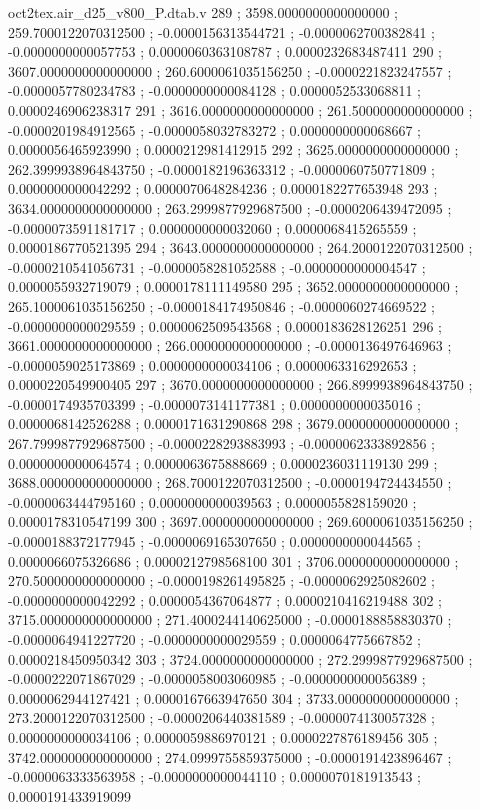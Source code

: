 \begin{filecontents}[overwrite]{oct2tex.air_d25_v800_P.dtab.v}
289 ; 3598.0000000000000000 ; 259.7000122070312500 ; -0.0000156313544721 ; -0.0000062700382841 ; -0.0000000000057753 ; 0.0000060363108787 ; 0.0000232683487411
290 ; 3607.0000000000000000 ; 260.6000061035156250 ; -0.0000221823247557 ; -0.0000057780234783 ; -0.0000000000084128 ; 0.0000052533068811 ; 0.0000246906238317
291 ; 3616.0000000000000000 ; 261.5000000000000000 ; -0.0000201984912565 ; -0.0000058032783272 ; 0.0000000000068667 ; 0.0000056465923990 ; 0.0000212981412915
292 ; 3625.0000000000000000 ; 262.3999938964843750 ; -0.0000182196363312 ; -0.0000060750771809 ; 0.0000000000042292 ; 0.0000070648284236 ; 0.0000182277653948
293 ; 3634.0000000000000000 ; 263.2999877929687500 ; -0.0000206439472095 ; -0.0000073591181717 ; 0.0000000000032060 ; 0.0000068415265559 ; 0.0000186770521395
294 ; 3643.0000000000000000 ; 264.2000122070312500 ; -0.0000210541056731 ; -0.0000058281052588 ; -0.0000000000004547 ; 0.0000055932719079 ; 0.0000178111149580
295 ; 3652.0000000000000000 ; 265.1000061035156250 ; -0.0000184174950846 ; -0.0000060274669522 ; -0.0000000000029559 ; 0.0000062509543568 ; 0.0000183628126251
296 ; 3661.0000000000000000 ; 266.0000000000000000 ; -0.0000136497646963 ; -0.0000059025173869 ; 0.0000000000034106 ; 0.0000063316292653 ; 0.0000220549900405
297 ; 3670.0000000000000000 ; 266.8999938964843750 ; -0.0000174935703399 ; -0.0000073141177381 ; 0.0000000000035016 ; 0.0000068142526288 ; 0.0000171631290868
298 ; 3679.0000000000000000 ; 267.7999877929687500 ; -0.0000228293883993 ; -0.0000062333892856 ; 0.0000000000064574 ; 0.0000063675888669 ; 0.0000236031119130
299 ; 3688.0000000000000000 ; 268.7000122070312500 ; -0.0000194724434550 ; -0.0000063444795160 ; 0.0000000000039563 ; 0.0000055828159020 ; 0.0000178310547199
300 ; 3697.0000000000000000 ; 269.6000061035156250 ; -0.0000188372177945 ; -0.0000069165307650 ; 0.0000000000044565 ; 0.0000066075326686 ; 0.0000212798568100
301 ; 3706.0000000000000000 ; 270.5000000000000000 ; -0.0000198261495825 ; -0.0000062925082602 ; -0.0000000000042292 ; 0.0000054367064877 ; 0.0000210416219488
302 ; 3715.0000000000000000 ; 271.4000244140625000 ; -0.0000188858830370 ; -0.0000064941227720 ; -0.0000000000029559 ; 0.0000064775667852 ; 0.0000218450950342
303 ; 3724.0000000000000000 ; 272.2999877929687500 ; -0.0000222071867029 ; -0.0000058003060985 ; -0.0000000000056389 ; 0.0000062944127421 ; 0.0000167663947650
304 ; 3733.0000000000000000 ; 273.2000122070312500 ; -0.0000206440381589 ; -0.0000074130057328 ; 0.0000000000034106 ; 0.0000059886970121 ; 0.0000227876189456
305 ; 3742.0000000000000000 ; 274.0999755859375000 ; -0.0000191423896467 ; -0.0000063333563958 ; -0.0000000000044110 ; 0.0000070181913543 ; 0.0000191433919099

\end{filecontents}
